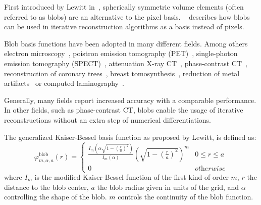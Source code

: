 First introduced by Lewitt in~\cite{lewitt_multidimensional_1990}, spherically symmetric volume
elements (often referred to as blobs) are an alternative to the pixel basis.
~\cite{lewitt_alternatives_1992} describes how blobs can be used in iterative reconstruction
algorithms as a basis instead of pixels.

Blob basis functions have been adopted in many different fields. Among others electron
microscopy~\cite{marabini_3d_1998, garduno_optimization_2001}, poistron emission tomography
(PET)~\cite{jacobs_comparative_1999, chlewicki_noise_2004}, single-photon emission tomography
(SPECT)~\cite{wang_3d_2004, yendiki_comparison_2004}, attenuation X-ray
CT~\cite{jacobs_iterative_1999, carvalho_helical_2003, isola_motion-compensated_2008},
phase-contrast CT~\cite{kohler_iterative_2011, xu_investigation_2012}, reconstruction of coronary
trees~\cite{zhou_blob-based_2008}, breast tomosynthesis~\cite{wu_breast_2010}, reduction of metal
artifacts~\cite{levakhina_two-step_2010} or computed laminography~\cite{trampert_spherically_2017}.


Generally, many fields report increased accuracy with a comparable performance. In other fields,
such as phase-contrast CT, blobs enable the usage of iterative reconstructions without an extra step
of numerical differentiations.

The generalized Kaiser-Bessel basis function as proposed by Lewitt, is defined as:
\begin{equation}\label{eq:blob_basis_fn}
	\varphi^{\text{blob}}_{m, \alpha, a}(r) =
	\begin{cases}
		\frac{I_m\left( \alpha \sqrt{1 - \left(\frac{r}{a}\right)^2} \right)} {I_m\left( \alpha \right)} \left( \sqrt{1 - \left(\frac{r}{a}\right)^2}\right)^m & 0 \le r \le a      \\
		0                                                                                                                                                      & \textit{otherwise}
	\end{cases}
\end{equation}
where \(I_m\) is the modified Kaiser-Bessel function of the first kind of order \(m\), \(r\) the
distance to the blob center, \(a\) the blob radius given in units of the grid, and \(\alpha\)
controlling the shape of the blob. \(m\) controls the continuity of the blob function.

